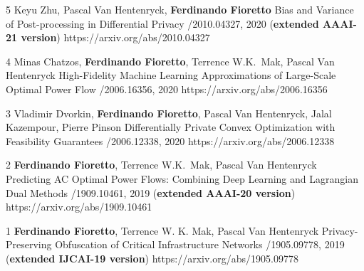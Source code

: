 \begin{pubs}
\wsentry 
	{5}%
	{Keyu Zhu, Pascal Van Hentenryck, {\bf Ferdinando Fioretto}}
	{Bias and Variance of Post-processing in Differential Privacy}
	{/2010.04327, 2020 ({\bf extended AAAI-21 version})}
	{https://arxiv.org/abs/2010.04327}

\wsentry
	{4}%
	{Minas Chatzos, {\bf Ferdinando Fioretto}, Terrence W.K.~Mak, Pascal Van Hentenryck}
	{High-Fidelity Machine Learning Approximations of Large-Scale Optimal Power Flow}
	{/2006.16356, 2020}
	{https://arxiv.org/abs/2006.16356}

\wsentry
	{3}%
	{Vladimir Dvorkin, {\bf Ferdinando Fioretto}, Pascal Van Hentenryck, Jalal Kazempour, Pierre Pinson}
	{Differentially Private Convex Optimization with Feasibility Guarantees}
	{/2006.12338, 2020}
	{https://arxiv.org/abs/2006.12338}

\wsentry
	{2}%
	{{\bf Ferdinando Fioretto}, Terrence W.K.~Mak, Pascal Van Hentenryck}
	{Predicting AC Optimal Power Flows: Combining Deep Learning and Lagrangian Dual Methods}
	{/1909.10461, 2019 ({\bf extended AAAI-20 version})}
	{https://arxiv.org/abs/1909.10461}

\wsentry
	{1}%
	{{\bf Ferdinando Fioretto}, Terrence W. K. Mak, Pascal Van Hentenryck}
	{Privacy-Preserving Obfuscation of Critical Infrastructure Networks} 
	{/1905.09778, 2019 ({\bf extended IJCAI-19 version})}
	{https://arxiv.org/abs/1905.09778}


\end{pubs}